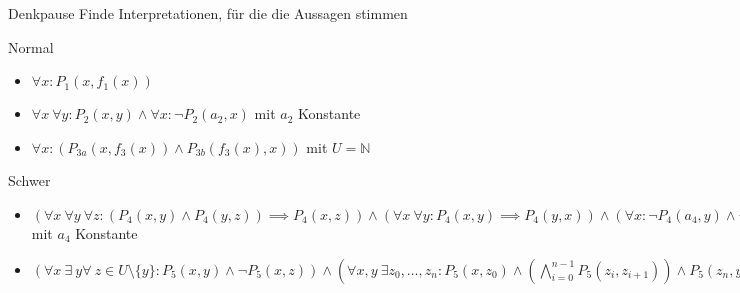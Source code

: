 {
\begin{frame}{Denkpause}
    Finde Interpretationen, für die die Aussagen stimmen
    \begin{block}{Normal}
        \begin{itemize}
            \item $\forall x: {P_1(x,f_1(x))}$
            \item $\forall x\ \forall y : P_2(x,y)\land \forall x : \lnot P_2(a_2,x)$ mit $a_2$ Konstante
            \item $\forall x : \left(P_{3a}(x,f_3(x))\land P_{3b}(f_3(x),x)\right)$ mit $U=\mathbb{N}$ %
        \end{itemize}
    \end{block}
    \begin{block}{Schwer}
        \begin{itemize}
            \item $\left( \forall x\ \forall y\ \forall z : \left(P_4(x,y) \land P_4(y,z)\right)\implies P_4(x,z)\right) \land
                      \left( \forall x\ \forall y : P_4(x,y) \implies P_4(y,x) \right) \land
                      \left( \forall x : \lnot P_4(a_4, y) \land \lnot P_4(y, a_4) \right)$
                  mit $a_4$ Konstante
            \item $\left(\forall x\ \exists\ y \forall\ z \in U\setminus\{y\} : P_5(x,y)\land\lnot P_5(x,z)\right) \land
                      \left(\forall x,y\ \exists z_0,\dots,z_n : P_5(x,z_0) \land \left(\bigwedge_{i=0}^{n-1} P_5(z_i,z_{i+1})\right) \land P_5(z_n,y)\right)$
        \end{itemize}
    \end{block}
\end{frame}

}

